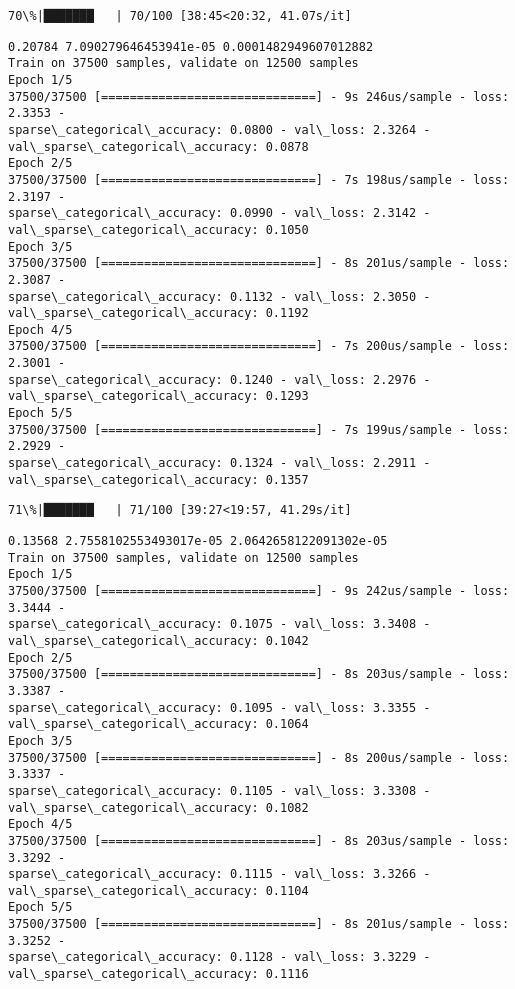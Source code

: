 \documentclass[11pt]{article}
\begin{document}
    \begin{Verbatim}[commandchars=\\\{\}]
 70\%|███████   | 70/100 [38:45<20:32, 41.07s/it]
    \end{Verbatim}

    \begin{Verbatim}[commandchars=\\\{\}]
0.20784 7.090279646453941e-05 0.0001482949607012882
Train on 37500 samples, validate on 12500 samples
Epoch 1/5
37500/37500 [==============================] - 9s 246us/sample - loss: 2.3353 -
sparse\_categorical\_accuracy: 0.0800 - val\_loss: 2.3264 -
val\_sparse\_categorical\_accuracy: 0.0878
Epoch 2/5
37500/37500 [==============================] - 7s 198us/sample - loss: 2.3197 -
sparse\_categorical\_accuracy: 0.0990 - val\_loss: 2.3142 -
val\_sparse\_categorical\_accuracy: 0.1050
Epoch 3/5
37500/37500 [==============================] - 8s 201us/sample - loss: 2.3087 -
sparse\_categorical\_accuracy: 0.1132 - val\_loss: 2.3050 -
val\_sparse\_categorical\_accuracy: 0.1192
Epoch 4/5
37500/37500 [==============================] - 7s 200us/sample - loss: 2.3001 -
sparse\_categorical\_accuracy: 0.1240 - val\_loss: 2.2976 -
val\_sparse\_categorical\_accuracy: 0.1293
Epoch 5/5
37500/37500 [==============================] - 7s 199us/sample - loss: 2.2929 -
sparse\_categorical\_accuracy: 0.1324 - val\_loss: 2.2911 -
val\_sparse\_categorical\_accuracy: 0.1357
    \end{Verbatim}

    \begin{Verbatim}[commandchars=\\\{\}]
 71\%|███████   | 71/100 [39:27<19:57, 41.29s/it]
    \end{Verbatim}

    \begin{Verbatim}[commandchars=\\\{\}]
0.13568 2.7558102553493017e-05 2.0642658122091302e-05
Train on 37500 samples, validate on 12500 samples
Epoch 1/5
37500/37500 [==============================] - 9s 242us/sample - loss: 3.3444 -
sparse\_categorical\_accuracy: 0.1075 - val\_loss: 3.3408 -
val\_sparse\_categorical\_accuracy: 0.1042
Epoch 2/5
37500/37500 [==============================] - 8s 203us/sample - loss: 3.3387 -
sparse\_categorical\_accuracy: 0.1095 - val\_loss: 3.3355 -
val\_sparse\_categorical\_accuracy: 0.1064
Epoch 3/5
37500/37500 [==============================] - 8s 200us/sample - loss: 3.3337 -
sparse\_categorical\_accuracy: 0.1105 - val\_loss: 3.3308 -
val\_sparse\_categorical\_accuracy: 0.1082
Epoch 4/5
37500/37500 [==============================] - 8s 203us/sample - loss: 3.3292 -
sparse\_categorical\_accuracy: 0.1115 - val\_loss: 3.3266 -
val\_sparse\_categorical\_accuracy: 0.1104
Epoch 5/5
37500/37500 [==============================] - 8s 201us/sample - loss: 3.3252 -
sparse\_categorical\_accuracy: 0.1128 - val\_loss: 3.3229 -
val\_sparse\_categorical\_accuracy: 0.1116
    \end{Verbatim}
\end{document}
